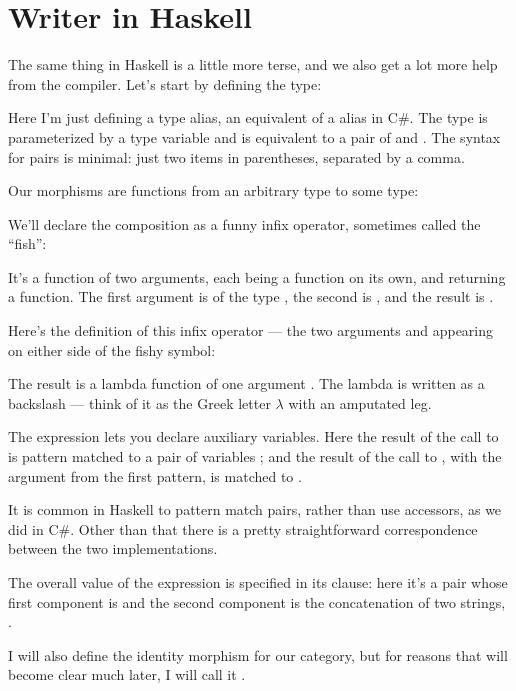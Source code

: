 \section{Writer in Haskell}

The same thing in Haskell is a little more terse, and we also get a lot
more help from the compiler. Let's start by defining the 
type:

Here I'm just defining a type alias, an equivalent of a 
alias in C\#. The type  is parameterized by
a type variable  and is equivalent to a pair of  and
. The syntax for pairs is minimal: just two items in
parentheses, separated by a comma.

Our morphisms are functions from an arbitrary type to some
 type:

We'll declare the composition as a funny infix operator, sometimes
called the ``fish'':

It's a function of two arguments, each being a function on its own, and
returning a function. The first argument is of the type
, the second is
, and the result is
.

Here's the definition of this infix operator --- the two arguments
 and  appearing on either side of the fishy
symbol:

The result is a lambda function of one argument . The lambda
is written as a backslash --- think of it as the Greek letter $\lambda$ with an
amputated leg.

The  expression lets you declare auxiliary variables. Here
the result of the call to  is pattern matched to a pair of
variables ; and the result of the call to ,
with the argument  from the first pattern, is matched to
.

It is common in Haskell to pattern match pairs, rather than use
accessors, as we did in C\#. Other than that there is a pretty
straightforward correspondence between the two implementations.

The overall value of the  expression is specified in its
 clause: here it's a pair whose first component is 
and the second component is the concatenation of two strings,
.

I will also define the identity morphism for our category, but for
reasons that will become clear much later, I will call it
.

